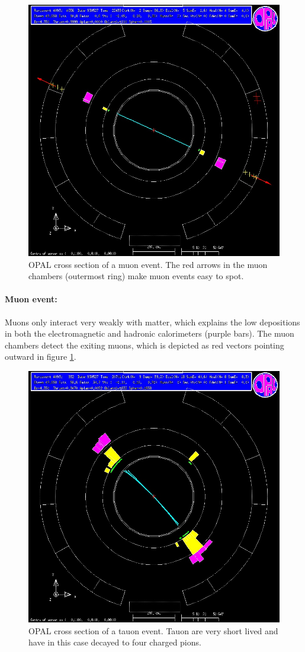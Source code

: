 \begin{figure}[H]
\centering
\includegraphics[width=0.75\linewidth]{graphics/muonopal}
\caption[OPAL cross section muon event]{OPAL cross section of a muon event. The red arrows in the muon chambers (outermost ring) make muon events easy to spot. \cite{cern}}
\label{fig:muonopal}
\end{figure}
\paragraph{Muon event:} Muons only interact very weakly with matter, which explains the low depositions in both the electromagnetic and hadronic calorimeters (purple bars). The muon chambers detect the exiting muons, which is depicted as red vectors pointing outward in figure \ref{fig:muonopal}.
\newpage
\begin{figure}[H]
\centering
\includegraphics[width=0.75\linewidth]{graphics/tauonopalhadronisch}
\caption[OPAL cross section tauon event]{OPAL cross section of a tauon event. Tauon are very short lived and have in this case decayed to four charged pions. \cite{cern}}
\label{fig:tauonopal}
\end{figure}
